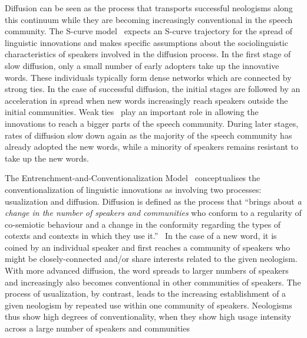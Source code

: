 \documentclass[
  a4paper,
  abstract=on,
  captions=tableabove,
  ]{scrartcl}
\begin{document}
    Diffusion can be seen as the process that transports successful neologisms along this continuum while they are becoming increasingly conventional in the speech community. The S-curve model~\parencite{Milroy1992LinguisticVariation, Nevalainen2015DescriptiveAdequacy, Labov2007TransmissionDiffusion} expects an S-curve trajectory for the spread of linguistic innovations and makes specific assumptions about the sociolinguistic characteristics of speakers involved in the diffusion process. In the first stage of slow diffusion, only a small number of early adopters take up the innovative words. These individuals typically form dense networks which are connected by strong ties. In the case of successful diffusion, the initial stages are followed by an acceleration in spread when new words increasingly reach speakers outside the initial communities. Weak ties~\parencite{Granovetter1977StrengthWeak} play an important role in allowing the innovations to reach a bigger parts of the speech community. During later stages, rates of diffusion slow down again as the majority of the speech community has already adopted the new words, while a minority of speakers remains resistant to take up the new words.

    The Entrenchment-and-Conventionalization Model~\parencite{Schmid2020DynamicsLinguistic} conceptualises the conventionalization of linguistic innovations as involving two processes: usualization and diffusion. Diffusion is defined as the process that \enquote{brings about \emph{a change in the number of speakers and communities} who conform to a regularity of co-semiotic behaviour and a change in the conformity regarding the types of cotexts and contexts in which they use it.}~\parencite[178--179, emphasis mine]{Schmid2020DynamicsLinguistic} In the case of a new word, it is coined by an individual speaker and first reaches a community of speakers who might be closely-connected and/or share interests related to the given neologism. With more advanced diffusion, the word spreads to larger numbers of speakers and increasingly also becomes conventional in other communities of speakers. The process of usualization, by contrast, leads to the increasing establishment of a given neologism by repeated use within one community of speakers. Neologisms thus show high degrees of conventionality, when they show high usage intensity across a large number of speakers and communities
    

\end{document}
